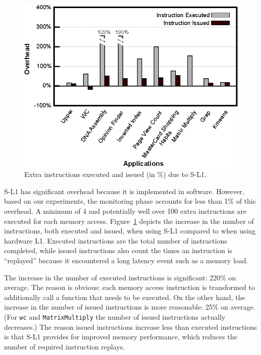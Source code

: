\begin{figure}[t]
\center
\includegraphics[scale=0.93]{4instructionIssueOverhead.eps}
\vspace{-0.0cm}
\caption{\footnotesize\textnormal{Extra instructions executed and issued (in \%) due to S-L1.}}
\label{fig:instexecissuedoverhead}
\end{figure}

S-L1 has significant overhead because it is implemented in software. 
However, based on our experiments, the monitoring phase accounts for less than 1\% of this overhead.
A minimum of 4 and potentially well over 100 extra
instructions are executed for each memory access.
Figure~\ref{fig:instexecissuedoverhead} depicts the increase in the number of instructions, both executed and issued,
when using S-L1 compared to when using hardware L1.
Executed instructions are the total number of instructions completed, while 
issued instructions also count the times an instruction is ``replayed'' because it
encountered a long latency event such as a memory load.

The increase in the number of executed instructions is significant: 220\% on average. 
The reason is obvious: each memory access instruction is transformed to additionally call a function that needs to be executed. 
On the other hand, the increase in the number of issued instructions is more reasonable: 25\% on average. 
(For \texttt{wc} and \texttt{MatrixMultiply} the number of issued instructions actually decreases.)
The reason issued instructions increase less than executed instructions is that S-L1 provides for improved memory performance, which reduces the number of required 
instruction replays.


